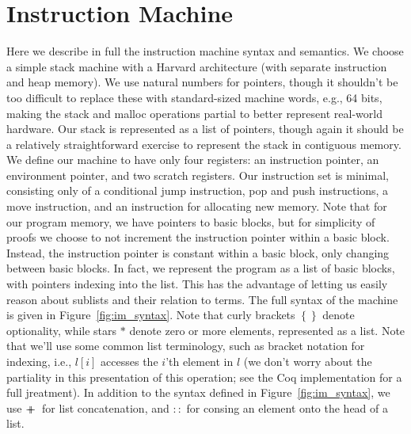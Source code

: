 \section{Instruction Machine} \label{sec:im_semantics}

Here we describe in full the instruction machine syntax and semantics. We choose a
simple stack machine with a Harvard architecture (with separate instruction and
heap memory). We use natural numbers for pointers, though it shouldn't be too
difficult to replace these with standard-sized machine words, e.g., 64 bits,
making the stack and malloc operations partial to better represent real-world
hardware. Our stack is represented as a list of pointers, though again it should
be a relatively straightforward exercise to represent the stack in contiguous
memory. We define our machine to have only four registers: an instruction
pointer, an environment pointer, and two scratch registers. Our instruction set
is minimal, consisting only of a conditional jump instruction, pop and push
instructions, a move instruction, and an instruction for allocating new
memory. Note that for our program memory, we have pointers to basic blocks, but
for simplicity of proofs we choose to not increment the instruction pointer
within a basic block.  Instead, the instruction pointer is constant within a
basic block, only changing between basic blocks. In fact, we represent the
program as a list of basic blocks, with pointers indexing into the list. This
has the advantage of letting us easily
reason about sublists and their relation to terms. The full syntax of the
machine is given in Figure~\ref{fig:im_syntax}. Note that curly brackets
$\left\{\right\}$ denote optionality, while stars $*$ denote zero or more
elements, represented as a list. Note that we'll use some common list
terminology, such as bracket notation for indexing, i.e., $l\left[i\right]$
accesses the $i$'th element in $l$ (we don't worry about the partiality in this
presentation of this operation; see the Coq implementation for a full
jreatment). In addition to the syntax defined in Figure~\ref{fig:im_syntax}, we
use $+\!\!\!\!+\,$ for list concatenation, and $::$ for consing an element onto the
head of a list. 

